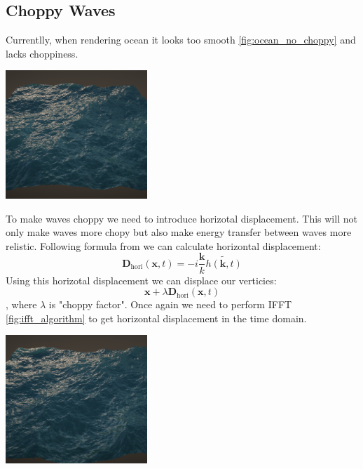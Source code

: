 \subsection{Choppy Waves}
Currentlly, when rendering ocean it looks too smooth \ref{fig:ocean_no_choppy} and lacks choppiness.

\begin{minipage}{1\textwidth}
    \centering
    \includegraphics[width=0.40\textwidth]{"images/rendered_height_no_coppy.png"}
    \label{fig:ocean_no_choppy}
\end{minipage}

To make waves choppy we need to introduce horizotal displacement. This will not only make waves more chopy but also make energy transfer between waves more relistic. Following formula from \cite[J. Tessendorf]{tessendorf2004} we can calculate horizontal displacement:
\begin{equation}
    \mathbf{D}_{\text{hori}}(\textbf{x}, t) = -i\frac{\mathbf{k}}{k}\tilde{h(\mathbf{k}, t)}
\end{equation}
Using this horizotal displacement we can displace our verticies:
\begin{equation}
    \mathbf{x} + \lambda \mathbf{D}_{\text{hori}}(\textbf{x}, t)
\end{equation}
, where $\lambda$ is "choppy factor".
Once again we need to perform IFFT \ref{fig:ifft_algorithm} to get horizontal displacement in the time domain.

\begin{minipage}{1\textwidth}
    \centering
    \includegraphics[width=0.40\textwidth]{"images/rendered_height_choppy.png"}
    \label{fig:ocean_choppy}
\end{minipage}

